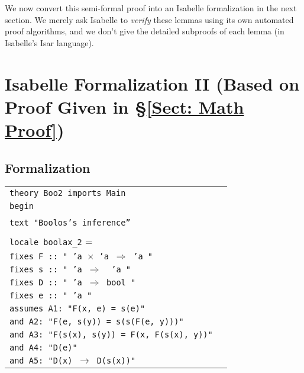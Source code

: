 \documentclass[11pt,a4paper]{article}
\newcommand{\bt}[2]{\small \begin{center}\begin{tabular}{p{#1 cm}p{#2 cm}}}
\def\et{\end{tabular}\end{center}\normalsize}
\theoremstyle{definition}
\begin{document}
We now convert this semi-formal proof into an Isabelle formalization in the next section. We merely ask Isabelle to \emph{verify} these lemmas using its own automated proof algorithms, and we don't give the detailed subproofs of each lemma (in Isabelle's Isar language).


\section{Isabelle Formalization II (Based on Proof Given in \S \ref{Sect: Math Proof})}\label{Sect: Isabelle II}

\subsection{Formalization}\label{Subsect: Isabelle II}

\bt{14}{0}
\texttt{theory Boo2 imports Main}\\
\texttt{begin}\\
\\
\texttt{text "Boolos's inference''}\\
\\
\texttt{locale boolax\_2} = \\
\hspace{3mm} \texttt{fixes F :: " 'a $\times$  'a $\Rightarrow$  'a "}\\
\hspace{3mm} \texttt{fixes s :: " 'a $\Rightarrow$ \ 'a "} \\
\hspace{3mm}  \texttt{fixes D :: " 'a $\Rightarrow$ bool "} \\
\hspace{3mm}  \texttt{fixes e ::  " 'a "} \\
\hspace{3mm}  \texttt{assumes A1: "F(x, e) = s(e)"} \\
\hspace{3mm}  \texttt{and  A2:  "F(e, s(y)) = s(s(F(e, y)))"}  \\
\hspace{3mm}  \texttt{and  A3: "F(s(x), s(y)) = F(x, F(s(x), y))"} \\
\hspace{3mm}  \texttt{and  A4:  "D(e)"} \\
\hspace{3mm}  \texttt{and A5: "D(x) $\longrightarrow$ D(s(x))"}
\et
\end{document}
